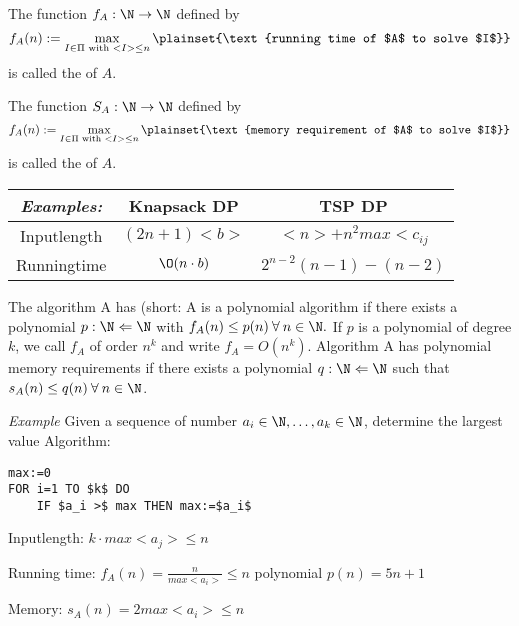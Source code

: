 The function $f_A:\N\rightarrow\N$ defined by
\[
	f_A(n) := \max_{I \in \Pi \text{ with } <I> \leq n} \plainset{\text{running time of $A$ to solve $I$}}
\] is called the  of $A$.

The function $S_A:\N\rightarrow\N$ defined by
\[
	f_A(n) := \max_{I \in \Pi \text{ with } <I> \leq n} \plainset{\text{memory requirement of $A$ to solve $I$}}
\] is called the  of $A$.

\begin{xmp+}
	\begin{tabular}{c|c|c}
	\emph{Examples:} & Knapsack DP & TSP DP \\
	\hline
	Inputlength & $(2n+1)<b>$ & $<n>+n^2 max<c_{ij}$ \\
	Runningtime & $\O (n\cdot b)$ & $2^{n-2}(n-1)-(n-2)$ \\
	\end{tabular}
\end{xmp+}

The algorithm A has  (short: A is a polynomial algorithm if there exists a polynomial $p:\N \Leftarrow \N $ with $f_A(n) \leq p(n) \: \forall \: n \in \N.$ If $p$ is a polynomial of degree $k$, we call $f_A$ of order $n^k$ and write $f_A= O(n^k)$. Algorithm A has polynomial memory requirements if there exists a polynomial $q:\N \Leftarrow \N$ such that $s_A(n) \leq q(n) \: \forall \: n \in \N$.

\emph{Example} Given a sequence of number $ a_i\in \N, \dots, a_k \in \N$, determine the largest value
Algorithm:
\begin{lstlisting}
max:=0
FOR i=1 TO $k$ DO
	IF $a_i >$ max THEN max:=$a_i$
\end{lstlisting}
Inputlength: $k \cdot max<a_j> \leq n$

Running time: $f_A(n)=\frac n {max<a_i>} \leq n$
				polynomial $p(n)=5n+1 $
				
Memory: $s_A(n)=2 max<a_i> \leq n$
